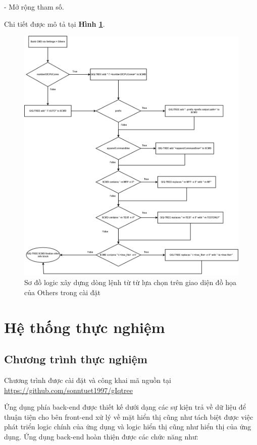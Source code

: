 \documentclass[12pt]{report}
\begin{document}
- Mở rộng tham số.

 Chi tiết được mô tả tại \textbf{Hình \ref{fig:image4.13}}.
 
 \begin{figure}[h]
	\centering
	\includegraphics[scale=0.4]{Image/4.13.png}
	\caption{Sơ đồ logic xây dựng dòng lệnh từ từ lựa chọn trên giao diện đồ họa của Others trong cài đặt }
	\label{fig:image4.13}
\end{figure}

\newpage	
\chapter{Hệ thống thực nghiệm}
\label{chap:chapter5}
\section{Chương trình thực nghiệm }
Chương trình được cài đặt và công khai mã nguồn tại \url{ https://github.com/sonntuet1997/gIqtree }

Ứng dụng phía back-end được thiết kế dưới dạng các sự kiện trả về dữ liệu để thuận tiện cho bên front-end xử lý về mặt hiển thị cũng như tách biệt được việc phát triển logic chính của ứng dụng và logic hiển thị cũng như hiển thị của ứng dụng. 
Ứng dụng back-end hoàn thiện được các chức năng như:
\end{document}
